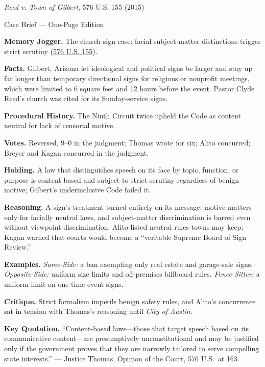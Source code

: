 \documentclass[12pt]{article}
\begin{document}
\begin{center}
{\Large \textit{Reed v. Town of Gilbert}, 576 U.S. 155 (2015)\par}
\vspace{0.3em}
{\normalsize Case Brief --- One-Page Edition\par}
\end{center}

\textbf{Memory Jogger.} The church-sign case: facial subject-matter distinctions trigger strict scrutiny (\href{https://supreme.justia.com/cases/federal/us/576/155/}{576 U.S. 155}).

\textbf{Facts.} Gilbert, Arizona let ideological and political signs be larger and stay up far longer than temporary directional signs for religious or nonprofit meetings, which were limited to 6 square feet and 12 hours before the event. Pastor Clyde Reed's church was cited for its Sunday-service signs.

\textbf{Procedural History.} The Ninth Circuit twice upheld the Code as content neutral for lack of censorial motive.

\textbf{Votes.} Reversed, 9--0 in the judgment; Thomas wrote for six; Alito concurred; Breyer and Kagan concurred in the judgment.

\textbf{Holding.} A law that distinguishes speech on its face by topic, function, or purpose is content based and subject to strict scrutiny regardless of benign motive; Gilbert's underinclusive Code failed it.

\textbf{Reasoning.} A sign's treatment turned entirely on its message; motive matters only for facially neutral laws, and subject-matter discrimination is barred even without viewpoint discrimination. Alito listed neutral rules towns may keep; Kagan warned that courts would become a ``veritable Supreme Board of Sign Review.''

\textbf{Examples.} \emph{Same-Side:} a ban exempting only real estate and garage-sale signs. \emph{Opposite-Side:} uniform size limits and off-premises billboard rules. \emph{Fence-Sitter:} a uniform limit on one-time event signs.

\textbf{Critique.} Strict formalism imperils benign safety rules, and Alito's concurrence sat in tension with Thomas's reasoning until \textit{City of Austin}.

\textbf{Key Quotation.} ``Content-based laws---those that target speech based on its communicative content---are presumptively unconstitutional and may be justified only if the government proves that they are narrowly tailored to serve compelling state interests.'' --- Justice Thomas, Opinion of the Court, 576 U.S.\ at 163.
\end{document}
